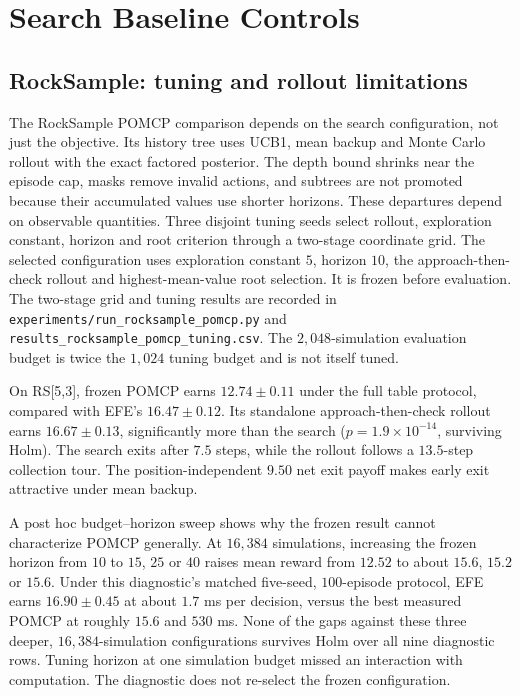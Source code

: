 \documentclass[runningheads]{llncs}
\begin{document}
\FloatBarrier

\section{Search Baseline Controls}

\subsection{RockSample: tuning and rollout limitations}
\label{app:rocksample}

The RockSample POMCP comparison depends on the search configuration, not just the objective. Its history tree uses UCB1, mean backup and Monte Carlo rollout with the exact factored posterior. The depth bound shrinks near the episode cap, masks remove invalid actions, and subtrees are not promoted because their accumulated values use shorter horizons. These departures depend on observable quantities. Three disjoint tuning seeds select rollout, exploration constant, horizon and root criterion through a two-stage coordinate grid. The selected configuration uses exploration constant $5$, horizon $10$, the approach-then-check rollout and highest-mean-value root selection. It is frozen before evaluation. The two-stage grid and tuning results are recorded in \texttt{experiments/\allowbreak run\_\allowbreak rocksample\_\allowbreak pomcp.py} and \texttt{results\_\allowbreak rocksample\_\allowbreak pomcp\_\allowbreak tuning.csv}. The $2{,}048$-simulation evaluation budget is twice the $1{,}024$ tuning budget and is not itself tuned.

On RS[5,3], frozen POMCP earns $12.74\pm0.11$ under the full table protocol, compared with EFE's $16.47\pm0.12$. Its standalone approach-then-check rollout earns $16.67\pm0.13$, significantly more than the search ($p=1.9\times10^{-14}$, surviving Holm). The search exits after $7.5$ steps, while the rollout follows a $13.5$-step collection tour. The position-independent $9.50$ net exit payoff makes early exit attractive under mean backup.

A post hoc budget--horizon sweep shows why the frozen result cannot characterize POMCP generally. At $16{,}384$ simulations, increasing the frozen horizon from $10$ to $15$, $25$ or $40$ raises mean reward from $12.52$ to about $15.6$, $15.2$ or $15.6$. Under this diagnostic's matched five-seed, $100$-episode protocol, EFE earns $16.90\pm0.45$ at about $1.7$ ms per decision, versus the best measured POMCP at roughly $15.6$ and $530$ ms. None of the gaps against these three deeper, $16{,}384$-simulation configurations survives Holm over all nine diagnostic rows. Tuning horizon at one simulation budget missed an interaction with computation. The diagnostic does not re-select the frozen configuration.
\end{document}
